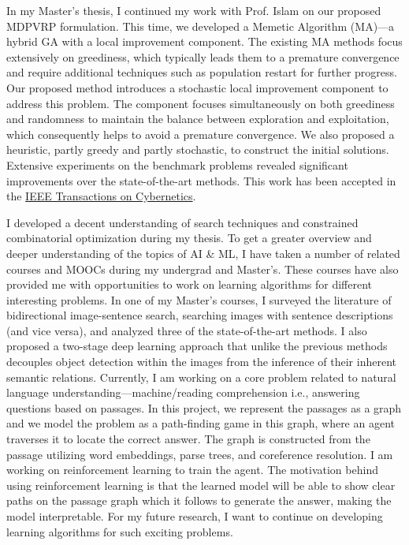 \documentclass[12pt]{article}
\begin{document}
In my Master's thesis, I continued my work with Prof. Islam on our proposed MDPVRP formulation. This time, we developed a Memetic Algorithm (MA)---a hybrid GA with a local improvement component. The existing MA methods focus extensively on greediness, which typically leads them to a premature convergence and require additional techniques such as population restart for further progress. Our proposed method introduces a stochastic local improvement component to address this problem. The component focuses simultaneously on both greediness and randomness to maintain the balance between exploration and exploitation, which consequently helps to avoid a premature convergence. We also proposed a heuristic, partly greedy and partly stochastic, to construct the initial solutions. Extensive experiments on the benchmark problems revealed significant improvements over the state-of-the-art methods. This work has been accepted in the \href{http://ieeexplore.ieee.org/document/7835722/}{IEEE Transactions on Cybernetics}. 


I developed a decent understanding of search techniques and constrained combinatorial optimization during my thesis. To get a greater overview and deeper understanding of the topics of AI \& ML, I have taken a number of related courses and MOOCs during my undergrad and Master's. These courses have also provided me with opportunities to work on learning algorithms for different interesting problems. In one of my Master's courses, I surveyed the literature of bidirectional image-sentence search, searching images with sentence descriptions (and vice versa), and analyzed three of the state-of-the-art methods. I also proposed a two-stage deep learning approach that unlike the previous methods decouples object detection within the images from the inference of their inherent semantic relations. Currently, I am working on a core problem related to natural language understanding---machine/reading comprehension i.e., answering questions based on passages. In this project, we represent the passages as a graph and we model the problem as a path-finding game in this graph, where an agent traverses it to locate the correct answer. The graph is constructed from the passage utilizing word embeddings, parse trees, and coreference resolution. I am working on reinforcement learning to train the agent. The motivation behind using reinforcement learning is that the learned model will be able to show clear paths on the passage graph which it follows to generate the answer, making the model interpretable. For my future research, I want to continue on developing learning algorithms for such exciting problems.   
\end{document}

